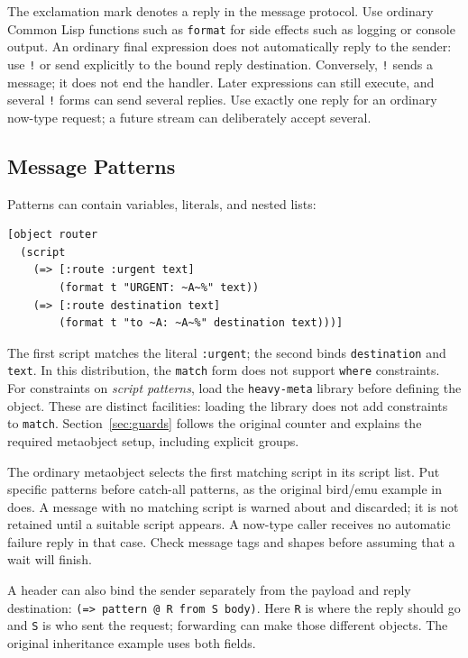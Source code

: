\documentclass[11pt,a4paper]{article}
\newcommand{\code}[1]{\texttt{#1}}
\newcommand{\filepath}[1]{\path{#1}}
\begin{document}
The exclamation mark denotes a reply in the message protocol.
Use ordinary Common Lisp functions such as \code{format} for side effects
such as logging or console output.
An ordinary final expression does not automatically reply to the sender:
use \code{!} or send explicitly to the bound reply destination.
Conversely, \code{!} sends a message; it does not end the handler.
Later expressions can still execute, and several \code{!}
forms can send several replies. Use exactly one reply for an ordinary
now-type request; a future stream can deliberately accept several.

\subsection{Message Patterns}

Patterns can contain variables, literals, and nested lists:

\begin{lstlisting}
[object router
  (script
    (=> [:route :urgent text]
        (format t "URGENT: ~A~%" text))
    (=> [:route destination text]
        (format t "to ~A: ~A~%" destination text)))]
\end{lstlisting}

The first script matches the literal \code{:urgent}; the second binds
\code{destination} and \code{text}. In this distribution, the
\code{match} form does not support \code{where} constraints.
For constraints on \emph{script patterns}, load the \code{heavy-meta}
library before defining the object. These are distinct facilities:
loading the library does not add constraints to \code{match}.
Section~\ref{sec:guards} follows the original counter and explains the
required metaobject setup, including explicit groups.

The ordinary metaobject selects the first matching script in its script
list. Put specific patterns before catch-all patterns, as the original
bird/emu example in \filepath{examples/misc/inherit.abclr2} does.
A message with no matching script is warned about and discarded;
it is not retained until a suitable script appears.
A now-type caller receives no automatic failure reply in that case.
Check message tags and shapes before assuming that a wait will finish.

A header can also bind the sender separately from the payload and reply
destination: \code{(=> pattern @ R from S body)}.
Here \code{R} is where the reply should go and \code{S} is who sent the
request; forwarding can make those different objects.
The original inheritance example uses both fields.
\end{document}
